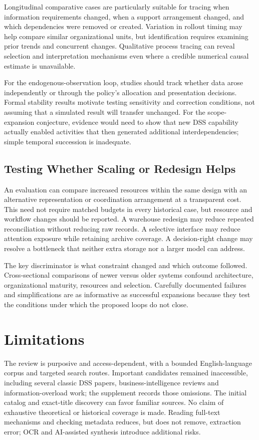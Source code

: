\documentclass[journal]{IEEEtran}
\begin{document}
Longitudinal comparative cases are particularly suitable for tracing when information requirements changed, when a support arrangement changed, and which dependencies were removed or created. Variation in rollout timing may help compare similar organizational units, but identification requires examining prior trends and concurrent changes. Qualitative process tracing can reveal selection and interpretation mechanisms even where a credible numerical causal estimate is unavailable.

For the endogenous-observation loop, studies should track whether data arose independently or through the policy's allocation and presentation decisions. Formal stability results motivate testing sensitivity and correction conditions, not assuming that a simulated result will transfer unchanged. For the scope-expansion conjecture, evidence would need to show that new DSS capability actually enabled activities that then generated additional interdependencies; simple temporal succession is inadequate.

\subsection{Testing Whether Scaling or Redesign Helps}
An evaluation can compare increased resources within the same design with an alternative representation or coordination arrangement at a transparent cost. This need not require matched budgets in every historical case, but resource and workflow changes should be reported. A warehouse redesign may reduce repeated reconciliation without reducing raw records. A selective interface may reduce attention exposure while retaining archive coverage. A decision-right change may resolve a bottleneck that neither extra storage nor a larger model can address.

The key discriminator is what constraint changed and which outcome followed. Cross-sectional comparisons of newer versus older systems confound architecture, organizational maturity, resources and selection. Carefully documented failures and simplifications are as informative as successful expansions because they test the conditions under which the proposed loops do not close.

\section{Limitations}
The review is purposive and access-dependent, with a bounded English-language corpus and targeted search routes. Important candidates remained inaccessible, including several classic DSS papers, business-intelligence reviews and information-overload work; the supplement records those omissions. The initial catalog and exact-title discovery can favor familiar sources. No claim of exhaustive theoretical or historical coverage is made. Reading full-text mechanisms and checking metadata reduces, but does not remove, extraction error; OCR and AI-assisted synthesis introduce additional risks.
\end{document}
